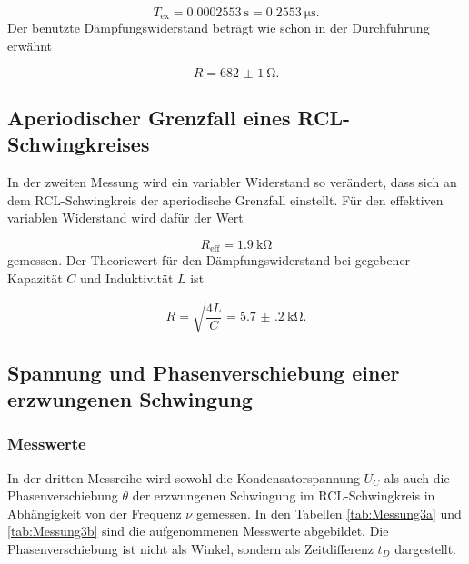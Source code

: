 \begin{equation}
  T_\text{ex} = \SI{0.0002553}{\second} = \SI{0.2553}{\micro\second} .
\end{equation}
Der benutzte Dämpfungswiderstand beträgt wie schon in der Durchführung erwähnt

\begin{equation}
  R = \SI{682(1)}{\ohm} .
\end{equation}


\subsection{Aperiodischer Grenzfall eines RCL-Schwingkreises}

In der zweiten Messung wird ein variabler Widerstand so verändert, dass
sich an dem RCL-Schwingkreis der aperiodische Grenzfall einstellt.
Für den effektiven variablen Widerstand wird dafür der Wert

\begin{equation}
  R_\text{eff} = \SI{1.9}{\kilo\ohm}
\end{equation}
gemessen.
Der Theoriewert für den Dämpfungswiderstand bei gegebener Kapazität $C$ und
Induktivität $L$ ist

\begin{equation}
  R = \sqrt{\frac{4L}{C}} = \SI{5.7(2)}{\kilo\ohm}.
\end{equation}


\subsection{Spannung und Phasenverschiebung
einer erzwungenen Schwingung}

\subsubsection{Messwerte}

In der dritten Messreihe wird sowohl die Kondensatorspannung $U_C$ als auch die
Phasenverschiebung $\theta$ der erzwungenen Schwingung im RCL-Schwingkreis in
Abhängigkeit von der Frequenz $\nu$ gemessen.
In den Tabellen \ref{tab:Messung3a} und \ref{tab:Messung3b}
sind die aufgenommenen Messwerte abgebildet.
Die Phasenverschiebung ist nicht als Winkel, sondern als Zeitdifferenz $t_D$
dargestellt.


